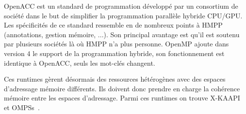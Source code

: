 OpenACC est un standard de programmation développé par un consortium de société dans le but de simplifier la programmation parallèle hybride CPU/GPU.
%
Les spécificités de ce standard ressemble en de nombreux points à HMPP (annotations, gestion mémoire, ...).
%
Son principal avantage est qu'il est soutenu par plusieurs sociétés là où HMPP n'a plus personne.
%
OpenMP ajoute dans version 4 le support de la programmation hybride, son fonctionnement est identique à OpenACC, seuls les mot-clés changent.



Ces runtimes gèrent désormais des ressources hétérogènes avec des espaces d'adressage mémoire différents.
%
Ils doivent donc prendre en charge la cohérence mémoire entre les espaces d'adressage.
%
Parmi ces runtimes on trouve X-KAAPI~\cite{xkaapi} et OMPSs~\cite{OMPSs}.

